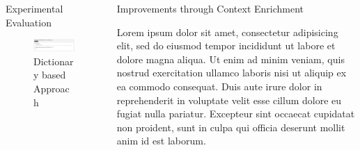 \documentclass[final,hyperref={pdfpagelabels=true}]{beamer}
\begin{document}
\begin{frame}
\begin{columns}[t, onlytextwidth]
\begin{column}{\textwidth}
\begin{columns}[t, onlytextwidth]
\begin{column}{.49\linewidth}
\begin{block}{Experimental Evaluation}
\begin{minipage}[t][.25\textheight][c]{\textwidth}
\begin{minipage}[t]{\textwidth}
\begin{minipage}[t]{.45\textwidth}
\begin{minipage}[t]{\textwidth}
\begin{figure}[H]
									 \centering
									 \includegraphics[width=\textwidth]{figures/questionaire_wordnik_example}
									 \caption{Dictionary based Approach}
									\end{figure}
								\end{minipage}
							\end{minipage}
						\end{minipage}
					\end{minipage}
				\end{block}
			\end{column}
			\begin{column}{.49\linewidth}
				\begin{block}{Improvements through Context Enrichment}
					\begin{minipage}[t][.25\textheight][c]{\textwidth}
						Lorem ipsum dolor sit amet, consectetur adipisicing elit, sed do eiusmod tempor incididunt ut labore et dolore magna aliqua. Ut enim ad minim veniam, quis nostrud exercitation ullamco laboris nisi ut aliquip ex ea commodo consequat. Duis aute irure dolor in reprehenderit in voluptate velit esse cillum dolore eu fugiat nulla pariatur. Excepteur sint occaecat cupidatat non proident, sunt in culpa qui officia deserunt mollit anim id est laborum.
					\end{minipage}
				\end{block}
			\end{column}
		\end{columns}
		
    \end{column}

  \end{columns}
\end{frame}
\end{document}
